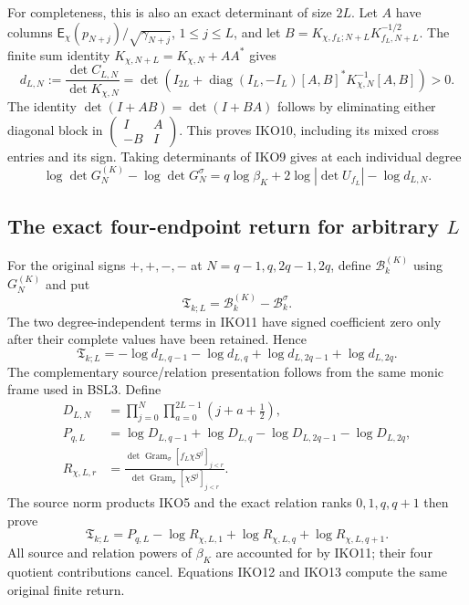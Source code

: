For completeness, this is also an exact determinant of size $2L$.
Let $A$ have columns $\mathsf E_\chi(p_{N+j})/\sqrt{\gamma_{N+j}}$,
$1\leq j\leq L$, and let
$B=K_{\chi,f_L;N+L}K_{f_L,N+L}^{-1/2}$. The finite sum identity
$K_{\chi,N+L}=K_{\chi,N}+AA^*$ gives
\[
 d_{L,N}:=\frac{\det C_{L,N}}{\det K_{\chi,N}}
 =\det\left(I_{2L}+\operatorname{diag}(I_L,-I_L)
       [A,B]^*K_{\chi,N}^{-1}[A,B]\right)>0.
 \tag{IKO10}
\]
The identity $\det(I+AB)=\det(I+BA)$ follows by eliminating either
diagonal block in $\left(\begin{smallmatrix}I&A\\-B&I\end{smallmatrix}\right)$.
This proves IKO10, including its mixed cross entries and its sign.
Taking determinants of IKO9 gives at each individual degree
\[
 \log\det G_N^{(K)}-\log\det G_N^\sigma
 =q\log\beta_K+2\log|\det U_{f_L}|-\log d_{L,N}.
 \tag{IKO11}
\]

\subsection{The exact four-endpoint return for arbitrary $L$}
For the original signs $+,+,-,-$ at $N=q-1,q,2q-1,2q$, define
$\mathcal B_k^{(K)}$ using $G_N^{(K)}$ and put
\[
 \mathfrak T_{k;L}=\mathcal B_k^{(K)}-\mathcal B_k^\sigma.
\]
The two degree-independent terms in IKO11 have signed coefficient
zero only after their complete values have been retained. Hence
\[
 \mathfrak T_{k;L}
   =-\log d_{L,q-1}-\log d_{L,q}
                  +\log d_{L,2q-1}+\log d_{L,2q}.
 \tag{IKO12}
\]
The complementary source/relation presentation follows from the
same monic frame used in BSL3. Define
\[
 \begin{split}
 D_{L,N}&=\prod_{j=0}^N\prod_{a=0}^{2L-1}(j+a+\tfrac12),\\
 P_{q,L}&=\log D_{L,q-1}+\log D_{L,q}
                    -\log D_{L,2q-1}-\log D_{L,2q},\\
 R_{\chi,L,r}&=\frac{\det\operatorname{Gram}_{\sigma}
                    [f_L\chi S^j]_{j<r}}
                  {\det\operatorname{Gram}_{\sigma}
                    [\chi S^j]_{j<r}}.
 \end{split}
\]
The source norm products IKO5 and the exact relation ranks $0,1,q,q+1$
then prove
\[
 \boxed{\mathfrak T_{k;L}
       =P_{q,L}-\log R_{\chi,L,1}
                    +\log R_{\chi,L,q}+\log R_{\chi,L,q+1}.}
 \tag{IKO13}
\]
All source and relation powers of $\beta_K$ are accounted for by
IKO11; their four quotient contributions cancel. Equations IKO12 and
IKO13 compute the same original finite return.

